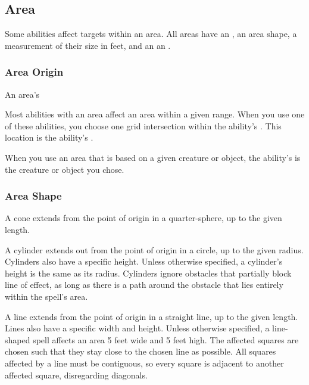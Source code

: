     \subsection{Area}\label{Area}

        Some abilities affect targets within an area.
        All areas have an , an area shape, a measurement of their size in feet, and an an .

    \subsubsection{Area Origin}

        An area's  

        Most abilities with an area affect an area within a given range.
        When you use one of these abilities, you choose one grid intersection within the ability's .
        This location is the ability's .

        When you use an area that is based on a given creature or object, the ability's  is the creature or object you chose.

        \subsubsection{Area Shape}

             A cone extends from the point of origin in a quarter-sphere, up to the given length.

             A cylinder extends out from the point of origin in a circle, up to the given radius.
            Cylinders also have a specific height.
            Unless otherwise specified, a cylinder's height is the same as its radius.
            Cylinders ignore obstacles that partially block line of effect, as long as there is a path around the obstacle that lies entirely within the spell's area.

             A line extends from the point of origin in a straight line, up to the given length.
            Lines also have a specific width and height.
            Unless otherwise specified, a line-shaped spell affects an area 5 feet wide and 5 feet high.
            The affected squares are chosen such that they stay close to the chosen line as possible.
            All squares affected by a line must be contiguous, so every square is adjacent to another affected square, disregarding diagonals.

